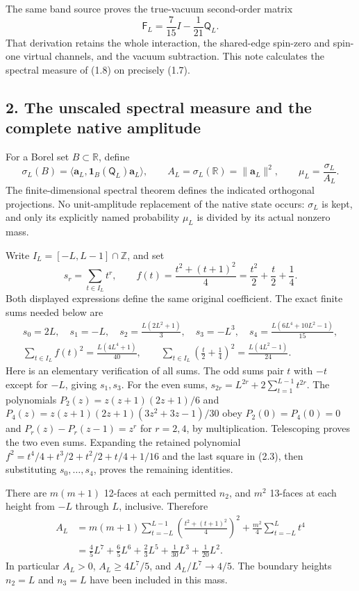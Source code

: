 \documentclass[
  11pt,
]{article}
\begin{document}
The same band source proves the true-vacuum second-order matrix \[
\mathsf F_L=\frac7{15}I-\frac1{21}\mathsf Q_L.
\tag{1.8}
\] That derivation retains the whole interaction, the shared-edge
spin-zero and spin-one virtual channels, and the vacuum subtraction.
This note calculates the spectral measure of (1.8) on precisely (1.7).

\subsection{2. The unscaled spectral measure and the complete native
amplitude}\label{magnetic-part-8-the-unscaled-spectral-measure-and-the-complete-native-amplitude}

For a Borel set \(B\subset\mathbb R\), define \[
\sigma_L(B)=\langle\boldsymbol a_L,
 \mathbf1_B(\mathsf Q_L)\boldsymbol a_L\rangle,
\qquad A_L=\sigma_L(\mathbb R)=\|\boldsymbol a_L\|^2,
\qquad \mu_L=\frac{\sigma_L}{A_L}.
\tag{2.1}
\] The finite-dimensional spectral theorem defines the indicated
orthogonal projections. No unit-amplitude replacement of the native
state occurs: \(\sigma_L\) is kept, and only its explicitly named
probability \(\mu_L\) is divided by its actual nonzero mass.

Write \(I_L=[-L,L-1]\cap\mathbb Z\), and set \[
s_r=\sum_{t\in I_L}t^r,
\qquad f(t)=\frac{t^2+(t+1)^2}{4}
 =\frac{t^2}{2}+\frac t2+\frac14.
\tag{2.2}
\] Both displayed expressions define the same original coefficient. The
exact finite sums needed below are \[
\begin{gathered}
s_0=2L,\quad s_1=-L,\quad s_2=\frac{L(2L^2+1)}3,
\quad s_3=-L^3,\quad
s_4=\frac{L(6L^4+10L^2-1)}{15},\\
\sum_{t\in I_L}f(t)^2=\frac{L(4L^4+1)}{40},\qquad
\sum_{t\in I_L}\left(\frac t2+\frac14\right)^2
 =\frac{L(4L^2-1)}{24}.
\end{gathered}
\tag{2.3}
\] Here is an elementary verification of all sums. The odd sums pair
\(t\) with \(-t\) except for \(-L\), giving \(s_1,s_3\). For the even
sums, \(s_{2r}=L^{2r}+2\sum_{t=1}^{L-1}t^{2r}\). The polynomials
\(P_2(z)=z(z+1)(2z+1)/6\) and \(P_4(z)=z(z+1)(2z+1)(3z^2+3z-1)/30\) obey
\(P_2(0)=P_4(0)=0\) and \(P_r(z)-P_r(z-1)=z^r\) for \(r=2,4\), by
multiplication. Telescoping proves the two even sums. Expanding the
retained polynomial \(f^2=t^4/4+t^3/2+t^2/2+t/4+1/16\) and the last
square in (2.3), then substituting \(s_0,\ldots,s_4\), proves the
remaining identities.

There are \(m(m+1)\) 12-faces at each permitted \(n_2\), and \(m^2\)
13-faces at each height from \(-L\) through \(L\), inclusive. Therefore
\[
\begin{split}
A_L
 &=m(m+1)\sum_{t=-L}^{L-1}
       \left(\frac{t^2+(t+1)^2}{4}\right)^2
   +\frac{m^2}{4}\sum_{t=-L}^{L}t^4\\
 &=\boxed{\frac45L^7+\frac65L^6+\frac23L^5
                  +\frac1{30}L^3+\frac1{20}L^2}.
\end{split}
\tag{2.4}
\] In particular \(A_L>0\), \(A_L\ge4L^7/5\), and
\(A_L/L^7\longrightarrow4/5\). The boundary heights \(n_2=L\) and
\(n_3=L\) have been included in this mass.
\end{document}
